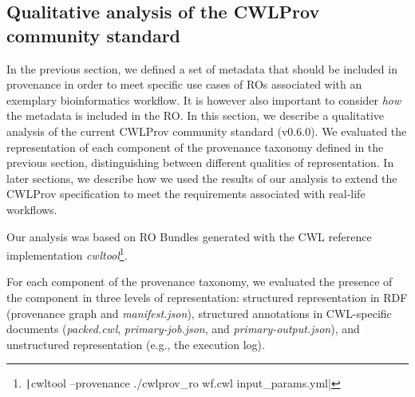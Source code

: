 \subsection{Qualitative analysis of the CWLProv community standard}

\label{sec:renske:cwlprov_evaluation}




In the previous section, we defined a set of metadata that should be included in provenance in order to meet specific use cases of ROs associated with an exemplary bioinformatics workflow. It is however also important to consider \emph{how} the metadata is included in the RO. In this section, we describe a qualitative analysis of the current CWLProv community standard (v0.6.0). %
We evaluated the representation of each component of the provenance taxonomy defined in the previous section, distinguishing between different qualities of representation. In later sections, we describe how we used the results of our analysis to extend the CWLProv specification to meet the requirements associated with real-life workflows.


Our analysis was based on RO Bundles generated with the CWL reference implementation \emph{cwltool}\footnote{
\texttt|cwltool --provenance ./cwlprov_ro wf.cwl input_params.yml|
}.

For each component of the provenance taxonomy, we evaluated the presence of the component in three levels of representation: structured representation in RDF (provenance graph and \emph{manifest.json}), structured annotations in CWL-specific documents (\emph{packed.cwl}, \emph{primary-job.json}, and \emph{primary-output.json}), and unstructured representation (e.g., the execution log). 

